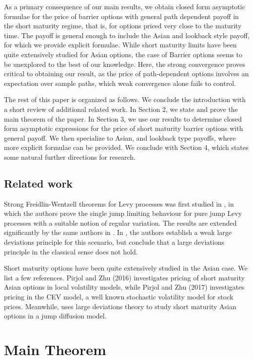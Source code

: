 \documentclass{article}
\theoremstyle{definition}
\theoremstyle{definition}
\begin{document}
As a primary consequence of our main results, we obtain closed form asymptotic formulae for the price of barrier options with general path dependent payoff in the short maturity regime, that is, for options priced very close to the maturity time. The payoff is general enough to include the Asian and lookback style payoff, for which we provide explicit formulae. While short maturity limits have been quite extensively studied for Asian options, the case of Barrier options seems to be unexplored to the best of our knowledge. Here, the strong convergence proves critical to obtaining our result, as the price of path-dependent options involves an expectation over sample paths, which weak convergence alone fails to control.

The rest of this paper is organized as follows. We conclude the introduction with a short review of additional related work. In Section 2, we state and prove the main theorem of the paper. In Section 3, we use our results to determine closed form asymptotic expressions for the price of short maturity barrier options with general payoff. We then specialize to Asian, and lookback type payoffs, where more explicit formulae can be provided. We conclude with Section 4, which states some natural further directions for research.

\subsection{Related work}
Strong Freidlin-Wentzell theorems for Levy processes was first studied in \cite{HULT2005249}, in which the authors prove the single jump limiting behaviour for pure jump Levy processes with a suitable notion of regular variation. The results are extended significantly by the same authors in \cite{Hult2007}. In \cite{rhee2017sample}, the authors establish a weak large deviations principle for this scenario, but conclude that a large deviations principle in the classical sense does not hold.

Short maturity options have been quite extensively studied in the Asian case. We list a few references. Pirjol and Zhu \cite{pirjol2016short} (2016) investigates pricing of short maturity Asian options in local volatility models, while Pirjol and Zhu \cite{Pirjolshort} (2017) investigates pricing in the CEV model, a well known stochastic volatility model for stock prices. Meanwhile, \cite{shoshi} uses large deviations theory to study short maturity Asian options in a jump diffusion model.

\section{Main Theorem}
\end{document}
